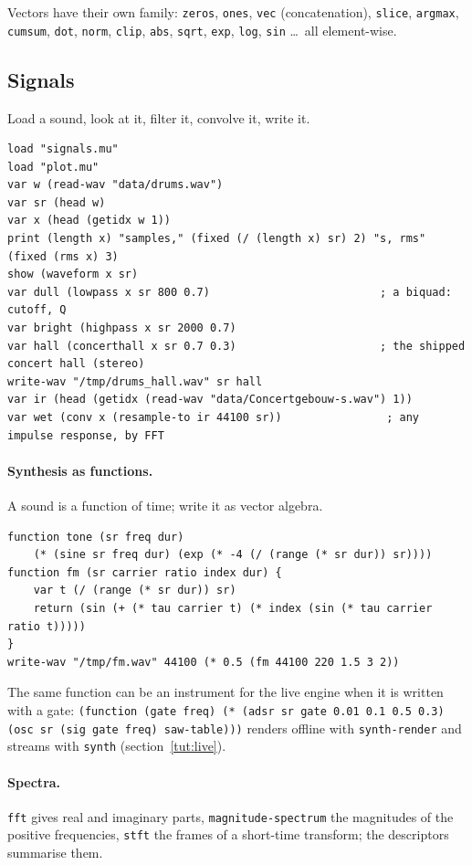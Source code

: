 \documentclass[11pt,a4paper]{article}
\newcommand{\musil}[1]{\lstinline[style=musilinline]{#1}}
\begin{document}
Vectors have their own family: \musil{zeros}, \musil{ones}, \musil{vec} (concatenation),
\musil{slice}, \musil{argmax}, \musil{cumsum}, \musil{dot}, \musil{norm}, \musil{clip},
\musil{abs}, \musil{sqrt}, \musil{exp}, \musil{log}, \musil{sin} \ldots\ all element-wise.

\subsection{Signals}

Load a sound, look at it, filter it, convolve it, write it.

\begin{lstlisting}
load "signals.mu"
load "plot.mu"
var w (read-wav "data/drums.wav")
var sr (head w)
var x (head (getidx w 1))
print (length x) "samples," (fixed (/ (length x) sr) 2) "s, rms" (fixed (rms x) 3)
show (waveform x sr)
var dull (lowpass x sr 800 0.7)                          ; a biquad: cutoff, Q
var bright (highpass x sr 2000 0.7)
var hall (concerthall x sr 0.7 0.3)                      ; the shipped concert hall (stereo)
write-wav "/tmp/drums_hall.wav" sr hall
var ir (head (getidx (read-wav "data/Concertgebouw-s.wav") 1))
var wet (conv x (resample-to ir 44100 sr))                ; any impulse response, by FFT
\end{lstlisting}

\paragraph{Synthesis as functions.} A sound is a function of time; write it as vector
algebra.

\begin{lstlisting}
function tone (sr freq dur)
    (* (sine sr freq dur) (exp (* -4 (/ (range (* sr dur)) sr))))
function fm (sr carrier ratio index dur) {
    var t (/ (range (* sr dur)) sr)
    return (sin (+ (* tau carrier t) (* index (sin (* tau carrier ratio t)))))
}
write-wav "/tmp/fm.wav" 44100 (* 0.5 (fm 44100 220 1.5 3 2))
\end{lstlisting}

The same function can be an instrument for the live engine when it is written with a
gate: \musil{(function (gate freq) (* (adsr sr gate 0.01 0.1 0.5 0.3) (osc sr (sig gate freq) saw-table)))}
renders offline with \musil{synth-render} and streams with \musil{synth} (section~\ref{tut:live}).

\paragraph{Spectra.} \musil{fft} gives real and imaginary parts, \musil{magnitude-spectrum}
the magnitudes of the positive frequencies, \musil{stft} the frames of a short-time
transform; the descriptors summarise them.
\end{document}
